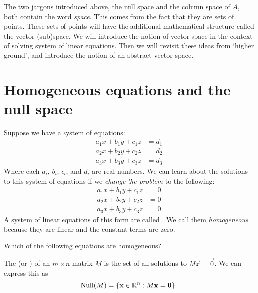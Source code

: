 \documentclass{ximera}
\begin{document}
The two jargons introduced above, the null space and the column space of $A$,
both contain the word \textit{space}. This comes from the fact that they are
sets of points. These sets of points will have the additional mathematical
structure called the vector (sub)space. We will introduce the notion of vector
space in the context of solving system of linear equations. Then we will revisit
these ideas from `higher ground', and introduce the notion of an abstract vector
space.

\section{Homogeneous equations and the null space}
Suppose we have a system of equations:
\begin{align*}
  a_1 x + b_1 y + c_1 z &= d_1\\
  a_2 x + b_2 y + c_2 z &= d_2\\
  a_3 x + b_3 y + c_3 z &= d_3
\end{align*}
Where each $a_i$, $b_i$, $c_i$, and $d_i$ are real numbers. We can
learn about the solutions to this system of equations if we
\textit{change the problem} to the following:
\begin{align*}
  a_1 x + b_1 y + c_1 z &= 0  \\
  a_2 x + b_2 y + c_2 z &= 0  \\
  a_3 x + b_3 y + c_3 z &= 0
\end{align*}
A system of linear equations of this form are called . We call
them \textit{homogeneous} because they are linear and the constant terms are zero.


\begin{question}
  Which of the following equations are homogeneous?
  \begin{selectAll}
  \end{selectAll}
\end{question}



\begin{definition}
  The  (or ) of an $m \times n$ matrix $M$ is
  the set of all solutions to $M\vec{x} = \vec{0}$. We can express
  this as
  \[
  \operatorname{Null}(M) = \{ \mathbf{x}\in\mathbb{R}^n: M\mathbf{x} = \mathbf{0}\}.
  \]
\end{definition}
\end{document}
